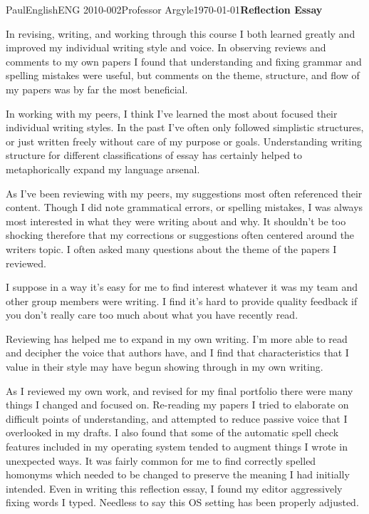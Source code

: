 \documentclass[12pt,letterpaper]{article}
\begin{document}
\begin{mla}{Paul}{English}{ENG 2010-002}{Professor Argyle}{\today}{\textbf{Reflection Essay}}

In revising, writing, and working through this course I both learned greatly and improved my individual writing style and voice. In observing reviews and comments to my own papers I found that understanding and fixing grammar and spelling mistakes were useful, but comments on the theme, structure, and flow of my papers was by far the most beneficial.

In working with my peers, I think I've learned the most about focused their individual writing styles. In the past I've often only followed simplistic structures, or just written freely without care of my purpose or goals. Understanding writing structure for different classifications of essay has certainly helped to metaphorically expand my language arsenal.

As I've been reviewing with my peers, my suggestions most often referenced their content. Though I did note grammatical errors, or spelling mistakes, I was always most interested in what they were writing about and why. It shouldn't be too shocking therefore that my corrections or suggestions often centered around the writers topic. I often asked many questions about the theme of the papers I reviewed.

I suppose in a way it's easy for me to find interest whatever it was my team and other group members were writing. I find it's hard to provide quality feedback if you don't really care too much about what you have recently read.

Reviewing has helped me to expand in my own writing. I'm more able to read and decipher the voice that authors have, and I find that characteristics that I value in their style may have begun showing through in my own writing.

As I reviewed my own work, and revised for my final portfolio there were many things I changed and focused on. Re-reading my papers I tried to elaborate on difficult points of understanding, and attempted to reduce passive voice that I overlooked in my drafts. I also found that some of the automatic spell check features included in my operating system tended to augment things I wrote in unexpected ways. It was fairly common for me to find correctly spelled homonyms which needed to be changed to preserve the meaning I had initially intended. Even in writing this reflection essay, I found my editor aggressively fixing words I typed. Needless to say this OS setting has been properly adjusted.


\end{mla}
\end{document}
